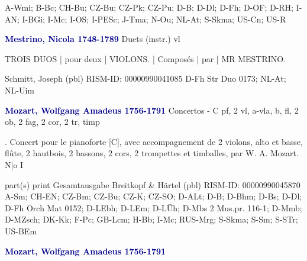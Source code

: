 \documentclass[twocolumn]{book}
\begin{document}
\newline A-Wmi; B-Bc; CH-Bu; CZ-Bu; CZ-Pk; CZ-Pu; D-B; D-Dl; D-Fh; D-OF; D-RH; I-AN; I-BGi; I-Mc; I-OS; I-PESc; J-Tma; N-Ou; NL-At; S-Skma; US-Cn; US-R
\newline \par \vspace{7pt} \textcolor{darkblue}{\textbf{Mestrino, Nicola  1748-1789}}
\newline Duets (instr.)
 vl
\newline \begin{itshape}TROIS DUOS | pour deux | VIOLONS. | Composés | par | MR MESTRINO.\end{itshape} 
\newline Schmitt, Joseph  (pbl)
\newline RISM-ID: 00000990041085
\newline D-Fh  Str Duo 0173; NL-At; NL-Uim
\newline \par \vspace{7pt} \textcolor{darkblue}{\textbf{Mozart, Wolfgang Amadeus  1756-1791}}
\newline Concertos - C
\newline pf, 2 vl, a-vla, b, fl, 2 ob, 2 fag, 2 cor, 2 tr, timp
\newline \begin{itshape}. Concert pour le pianoforte [C], avec accompagnement de 2 violons, alto et basse, flûte, 2 hautbois, 2 bassons, 2 cors, 2 trompettes et timballes, par W. A. Mozart. N|o I\end{itshape} 
\newline \textcolor{darkblue}{}  part(s)
\newline print
\newline Gesamtausgabe
\newline Breitkopf \& Härtel  (pbl)
\newline RISM-ID: 00000990045870
\newline A-Sm; CH-EN; CZ-Bm; CZ-Bu; CZ-K; CZ-SO; D-ALt; D-B; D-Bhm; D-Bs; D-Dl; D-Fh  Orch Mat 0152; D-LEbh; D-LEm; D-LÜh; D-Mbs  2 Mus.pr. 116-1; D-Mmb; D-MZsch; DK-Kk; F-Pc; GB-Lcm; H-Bb; I-Mc; RUS-Mrg; S-Skma; S-Sm; S-STr; US-BEm
\newline \par \vspace{7pt} \textcolor{darkblue}{\textbf{Mozart, Wolfgang Amadeus  1756-1791}}
\end{document}

